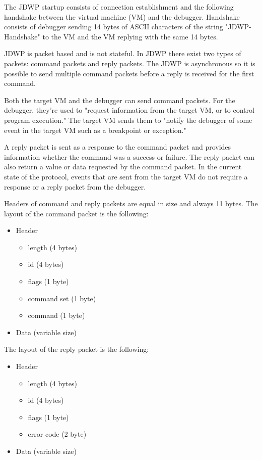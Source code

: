 \documentclass[..thesis.tex]{subfiles}
\begin{document}
The JDWP startup consists of connection establishment and the following handshake between the virtual machine (VM) and the debugger.
Handshake consists of debugger sending 14 bytes of ASCII characters of the string "JDWP-Handshake" to the VM and the VM replying with the same 14 bytes.\cite{oracle_jdwp_spec}

JDWP is packet based and is not stateful. In JDWP there exist two types of packets: command packets and reply packets.
The JDWP is asynchronous so it is possible to send multiple command packets before a reply is received for the first command.

Both the target VM and the debugger can send command packets. For the debugger, they're used to "request information from the target VM, or to control program execution."
The target VM sends them to "notify the debugger of some event in the target VM such as a breakpoint or exception."\cite{oracle_jdwp_spec}

A reply packet is sent as a response to the command packet and provides information whether the command was a success or failure. The reply packet can also return a value or data requested by the command packet. In the current state of the protocol, events that are sent from the target VM do not require a response or a reply packet from the debugger.\cite{oracle_jdwp_spec}

Headers of command and reply packets are equal in size and always 11 bytes. The layout of the command packet is the following:
\begin{itemize}[nosep]
  \item Header
    \begin{itemize}[nosep]
      \item length (4 bytes)
      \item id (4 bytes)
      \item flags (1 byte)
      \item command set (1 byte)
      \item command (1 byte)
    \end{itemize}
  \item Data (variable size) 
\end{itemize}

The layout of the reply packet is the following:
\begin{itemize}[nosep]
  \item Header
    \begin{itemize}[nosep]
      \item length (4 bytes)
      \item id (4 bytes)
      \item flags (1 byte)
      \item error code (2 byte)
    \end{itemize}
  \item Data (variable size) 
\end{itemize}
\end{document}
